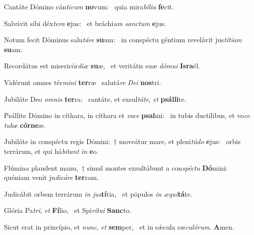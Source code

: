 \item Cantáte Dómino cán\textit{ticum} \textbf{no}vum:~\psstar{} quia mira\textit{bília} \textbf{fe}cit.
\item Salvávit sibi déx\textit{tera} \textbf{e}jus:~\psstar{} et bráchi\textit{um} \textit{sanctum} \textbf{e}jus.
\item Notum fecit Dóminus salu\textit{táre} \textbf{su}um:~\psstar{} in conspéctu géntium revelávit jus\textit{títiam} \textbf{su}am.
\item Recordátus est misericór\textit{diæ} \textbf{su}æ,~\psstar{} et veritátis suæ \textit{dómui} \textbf{Is}\textbf{ra}ël.
\item Vidérunt omnes tér\textit{mini} \textbf{ter}ræ~\psstar{} salutá\textit{re} \textit{Dei} \textbf{nos}tri.
\item Jubiláte Deo \textit{omnis} \textbf{ter}ra:~\psstar{} cantáte, et exsul\textit{táte}, \textit{et} \textbf{psál}\textbf{li}te.
\item Psállite Dómino in cíthara, in cíthara et \textit{voce} \textbf{psal}mi:~\psstar{} in tubis ductílibus, et vo\textit{ce} \textit{tubæ} \textbf{cór}\textbf{ne}æ.
\item Jubiláte in conspéctu regis Dómini:~† moveátur mare, et pleni\textit{túdo} \textbf{e}jus:~\psstar{} orbis terrárum, et qui há\textit{bitant} \textit{in} \textbf{e}o.
\item Flúmina plaudent manu,~† simul montes exsultábunt a con\textit{spéctu} \textbf{Dó}mini:~\psstar{} quóniam venit ju\textit{dicáre} \textbf{ter}ram.
\item Judicábit orbem terrárum \textit{in} \textit{jus}\textbf{tí}tia,~\psstar{} et pópulos \textit{in} \textit{æqui}\textbf{tá}te.
\item Glória Pa\textit{tri}, \textit{et} \textbf{Fí}lio,~\psstar{} et Spi\textit{rítui} \textbf{Sanc}to.
\item Sicut erat in princípio, et \textit{nunc}, \textit{et} \textbf{sem}per,~\psstar{} et in sǽcula sæ\textit{culórum}. \textbf{A}men.
